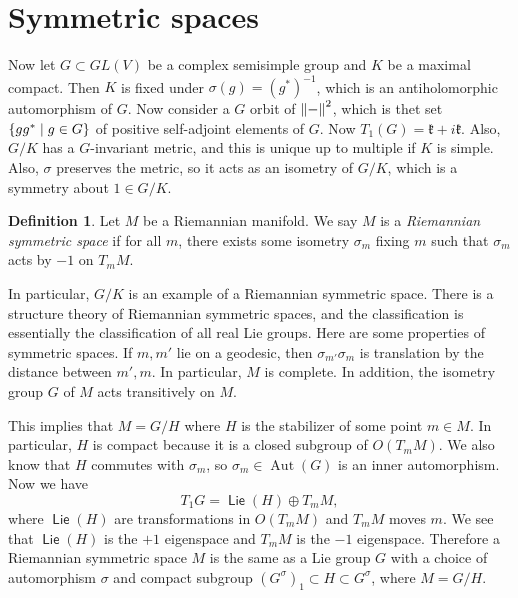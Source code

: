 \documentclass[leqno, openany]{memoir}
\theoremstyle{definition}
\newtheorem{defn}[thm]{Definition}
\theoremstyle{remark}
\theoremstyle{plain}
\theoremstyle{definition}
\theoremstyle{remark}
\newcommand{\mf}[1]{\mathfrak{#1}}
\DeclareMathOperator{\Aut}{Aut}
\DeclareMathOperator{\Lie}{\mathsf{Lie}}
\begin{document}
\section{Symmetric spaces}%
\label{sec:symmetric_spaces}

Now let $G \subset GL(V)$ be a complex semisimple group and $K$ be a maximal compact. Then $K$ is fixed under $\sigma(g) = {(g^*)}^{-1}$, which is an antiholomorphic automorphism of $G$. Now consider a $G$ orbit of $\norm{-}^2$, which is thet set $\qty{gg^* \mid g \in G}$ of positive self-adjoint elements of $G$. Now $T_1(G) = \mf{k} + i \mf{k}$. Also, $G/K$ has a $G$-invariant metric, and this is unique up to multiple if $K$ is simple. Also, $\sigma$ preserves the metric, so it acts as an isometry of $G/K$, which is a symmetry about $1 \in G/K$.

\begin{defn}
    Let $M$ be a Riemannian manifold. We say $M$ is a \textit{Riemannian symmetric space} if for all $m$, there exists some isometry $\sigma_m$ fixing $m$ such that $\sigma_m$ acts by $-1$ on $T_m M$.
\end{defn}

In particular, $G/K$ is an example of a Riemannian symmetric space. There is a structure theory of Riemannian symmetric spaces, and the classification is essentially the classification of all real Lie groups. Here are some properties of symmetric spaces. If $m, m'$ lie on a geodesic, then $\sigma_{m'} \sigma_m$ is translation by the distance between $m', m$. In particular, $M$ is complete. In addition, the isometry group $G$ of $M$ acts transitively on $M$.

This implies that $M = G/H$ where $H$ is the stabilizer of some point $m \in M$. In particular, $H$ is compact because it is a closed subgroup of $O(T_m M)$. We also know that $H$ commutes with $\sigma_m$, so $\sigma_m \in \Aut(G)$ is an inner automorphism. Now we have
\[ T_1 G = \Lie(H) \oplus T_m M, \]
where $\Lie(H)$ are transformations in $O(T_m M)$ and $T_m M$ moves $m$. We see that $\Lie(H)$ is the $+1$ eigenspace and $T_m M$ is the $-1$ eigenspace. Therefore a Riemannian symmetric space $M$ is the same as a Lie group $G$ with a choice of automorphism $\sigma$ and compact subgroup ${(G^{\sigma})}_1 \subset H \subset G^{\sigma}$, where $M = G/H$.
\end{document}
